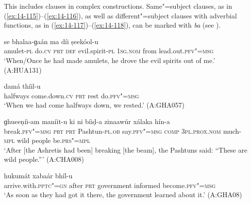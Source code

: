 This includes clauses in complex constructions. Same"=subject clauses, as in (\ref{ex:14-115})--(\ref{ex:14-116}), as well as different"=subject clauses with adverbial functions, as in (\ref{ex:14-117})--(\ref{ex:14-118}), can be marked with \textit{ba} (see ).

\begin{exe}
\ex
\label{ex:14-115}
 se bhalaa-ɡaán ma  díi ṣeekóol-u \\
amulet-\textsc{pl} do.\textsc{cv} \textsc{prt} \textsc{def} evil.spirit-\textsc{pl} \textsc{1sg.nom} from lead.out.\textsc{pfv"=msg}{\protect\footnotemark} \\
\glt `When/Once he had made amulets, he drove the evil spirits out of me.' (A:HUA131)

\ex
\label{ex:14-116}
 damá thíil-u \\
halfways come.down.\textsc{cv} \textsc{prt} rest do.\textsc{pfv"=msg } \\
\glt `When we had come halfways down, we rested.' (A:GHA057)

\ex
\label{ex:14-117}
\gll [phooṭóol-u ta ba] ɡhueeṇíi-am maníit-u  ki ni bíiḍ-a zinaawúr
xálaka  hín-a \\
break.\textsc{pfv"=msg} \textsc{prt} \textsc{prt} Pashtun-\textsc{pl.ob} say.\textsc{pfv"=msg}  \textsc{comp} \textsc{3pl.prox.nom} much-\textsc{mpl} wild people be.\textsc{prs"=mpl } \\
\glt `After [the Ashretis had been] breaking [the beam], the Pashtuns said: ``These are wild people.''' (A:CHA008)

\ex
\label{ex:14-118}
\gll [phedóol"=ii pahúrta ba] hukumát xabaár  bhíl-u \\
arrive.with.\textsc{pptc"=gn} after \textsc{prt} government informed become.\textsc{pfv"=msg}\\
\glt `As soon as they had got it there, the government learned about it.' (A:GHA08)
\end{exe}

